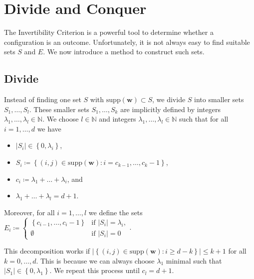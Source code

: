 \section{Divide and Conquer}\label{sec:divide-and-conquer}

The Invertibility Criterion is a powerful tool to determine whether a configuration is an outcome. Unfortunately, it is not always easy to find suitable sets \( S \) and \( E \). We now introduce a method to construct such sets.

\subsection*{Divide}\label{subsec:divide}

Instead of finding one set \( S \) with \( \mathrm{supp}(\mathbf w) \subset S \), we divide \( S \) into smaller sets \( S_1, \dots, S_l \). These smaller sets \( S_1, \dots, S_k \) are implicitly defined by integers \( \lambda_1, \dots, \lambda_l \in \mathbb{N} \). We choose \( l \in \mathbb{N} \) and integers \( \lambda_1, \dots, \lambda_l \in \mathbb{N} \) such that for all \( i=1, \dots, d \) we have 
\begin{itemize}
    \item \( \lvert S_i \rvert \in \left\{ 0, \lambda_i \right\} \), 
    \item \( S_i \coloneqq \left\{ (i,j) \in \mathrm{supp}(\mathbf w) : i = c_{k-1}, \dots, c_k - 1 \right\} \),
    \item  \( c_i \coloneqq \lambda_1 + \dots + \lambda_i\), and
    \item \(  \lambda_1 + \dots + \lambda_l = d+1 \).
\end{itemize}
Moreover, for all \( i=1, \dots, l \) we define the sets \( E_i \coloneqq \begin{cases}
    \left\{ c_{i-1}, \dots, c_i - 1 \right\} & \text{if } \lvert S_i \rvert = \lambda_i, \\
    \emptyset & \text{if } \lvert S_i \rvert = 0
\end{cases} \).

\begin{remark}\label{rem:ksldmfiewonowiniew}
This decomposition works if \( \lvert \left\{ (i,j) \in \mathrm{supp}(\mathbf{w}) : i \geq d-k \right\} \rvert \leq k+1 \) for all \( k = 0, \dots, d \). This is because we can always choose \( \lambda_1  \) minimal such that \( \lvert S_1 \rvert \in \left\{ 0, \lambda_1 \right\} \). We repeat this process until \( c_l = d+1 \). 
\end{remark}

